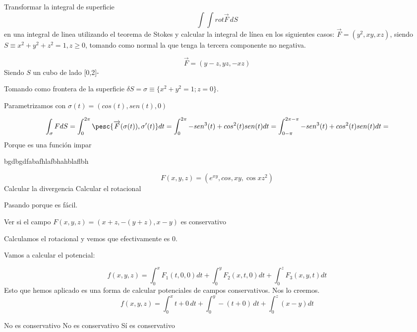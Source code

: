 \begin{problem}[20]
Transformar la integral de superficie \[\int\int rot\overrightarrow{F}\,dS\]
en una integral de linea utilizando el teorema de Stokes y calcular la integral de línea en los siguientes casos:
\ppart
$\overrightarrow{F} = (y^2,xy,xz)$, siendo $S \equiv x^2+y^2+z^2=1, z\geq 0$, tomando como normal la que tenga la tercera componente no negativa.

\ppart
 \[\overrightarrow{F} = (y-z,yz,-xz)\]
 Siendo $S$ un cubo de lado [0,2]-
\solution

\spart
Tomando como frontera de la superficie $\delta S = \sigma \equiv\{ x^2+y^2=1; z=0\}$.

Parametrizamos con $\sigma(t) = (cos(t),sen(t),0)$

\[
\int_{\sigma} FdS = \int_0^{2\pi}
\pesc{ \overrightarrow{F}(\sigma(t)), \sigma'(t)} dt = \int_0^{2\pi} -sen^3(t) + cos^2(t)sen(t) dt = \int_{0-\pi}^{2\pi-\pi} -sen^3(t) + cos^2(t)sen(t) dt =
\]
Porque es una función impar

\spart

bgdbgdfabafhlafbhahblaflbh

\end{problem}



\begin{problem}[18]
\[F(x,y,z) = \left(e^{xy},cos
,xy,\cos xz^2\right)\]
\ppart Calcular la divergencia
\ppart Calcular el rotacional
\solution

Pasando porque es fácil.

\end{problem}

\begin{problem}[19]

\ppart Ver si el campo  $ F(x,y,z) = (x+z,-(y+z),x-y)$ es conservativo
\ppart
\ppart
\ppart

\solution

\spart Calculamos el rotacional y vemos que efectivamente es 0.

Vamos a calcular el potencial:

\[f(x,y,z) = \int_0^x F_1(t,0,0)dt + \int_0^y F_2(x,t,0)dt + \int_0^z F_3(x,y,t)dt \]
Esto que hemos aplicado es una forma de calcular potenciales de campos conservativos. Nos lo creemos.
\[f(x,y,z) = \int_0^x t+0 \,dt + \int_0^y -(t+0)\,dt + \int_0^z (x-y)dt\]

\spart No es conservativo
\spart No es conservativo
\spart Sí es conservativo

\end{problem}

